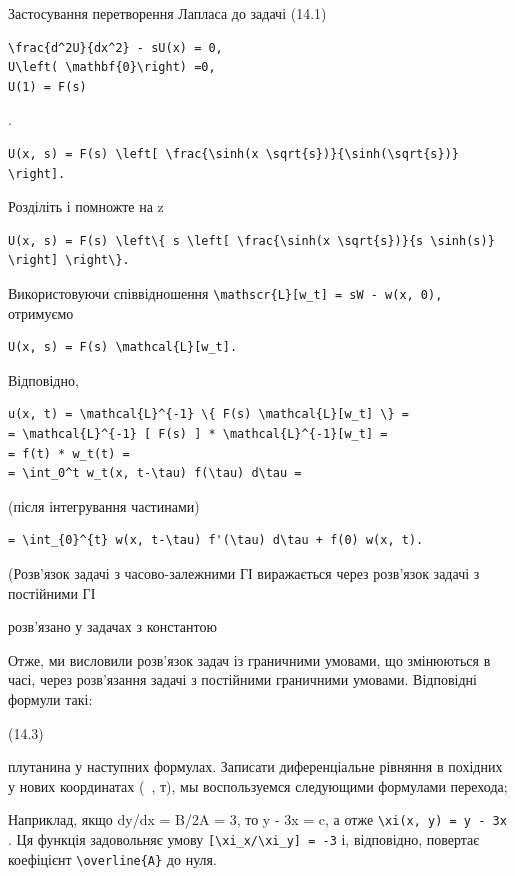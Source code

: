 \documentclass[
  ukrainian,
]{article}
\begin{document}
Застосування перетворення Лапласа до задачі (14.1)

\begin{verbatim}
\frac{d^2U}{dx^2} - sU(x) = 0,
U\left( \mathbf{0}\right) =0,
U(1) = F(s)
\end{verbatim}

.

\begin{verbatim}
U(x, s) = F(s) \left[ \frac{\sinh(x \sqrt{s})}{\sinh(\sqrt{s})} \right].
\end{verbatim}

Розділіть і помножте на z

\begin{verbatim}
U(x, s) = F(s) \left\{ s \left[ \frac{\sinh(x \sqrt{s})}{s \sinh(s)} \right] \right\}.
\end{verbatim}

Використовуючи співвідношення
\texttt{\textbackslash{}mathscr\{L\}{[}w\_t{]}\ =\ sW\ -\ w(x,\ 0),}
отримуємо

\begin{verbatim}
U(x, s) = F(s) \mathcal{L}[w_t].
\end{verbatim}

Відповідно,

\begin{verbatim}
u(x, t) = \mathcal{L}^{-1} \{ F(s) \mathcal{L}[w_t] \} =
= \mathcal{L}^{-1} [ F(s) ] * \mathcal{L}^{-1}[w_t] =
= f(t) * w_t(t) =
= \int_0^t w_t(x, t-\tau) f(\tau) d\tau =
\end{verbatim}

(після інтегрування частинами)

\begin{verbatim}
= \int_{0}^{t} w(x, t-\tau) f'(\tau) d\tau + f(0) w(x, t).
\end{verbatim}

(Розв'язок задачі з часово-залежними ГІ виражається через розв'язок
задачі з постійними ГІ

розв'язано у задачах з константою

Отже, ми висловили розв'язок задач із граничними умовами, що змінюються
в часі, через розв'язання задачі з постійними граничними умовами.
Відповідні формули такі:

(14.3)

плутанина у наступних формулах. Записати диференціальне рівняння в
похідних у нових координатах (~, т), мы воспользуемся следующими
формулами перехода;

Наприклад, якщо dy/dx = B/2A = 3, то y - 3x = c, а отже
\texttt{\textbackslash{}xi(x,\ y)\ =\ y\ -\ 3x} . Ця функція задовольняє
умову \texttt{{[}\textbackslash{}xi\_x/\textbackslash{}xi\_y{]}\ =\ -3}
і, відповідно, повертає коефіцієнт
\texttt{\textbackslash{}overline\{A\}} до нуля.
\end{document}

